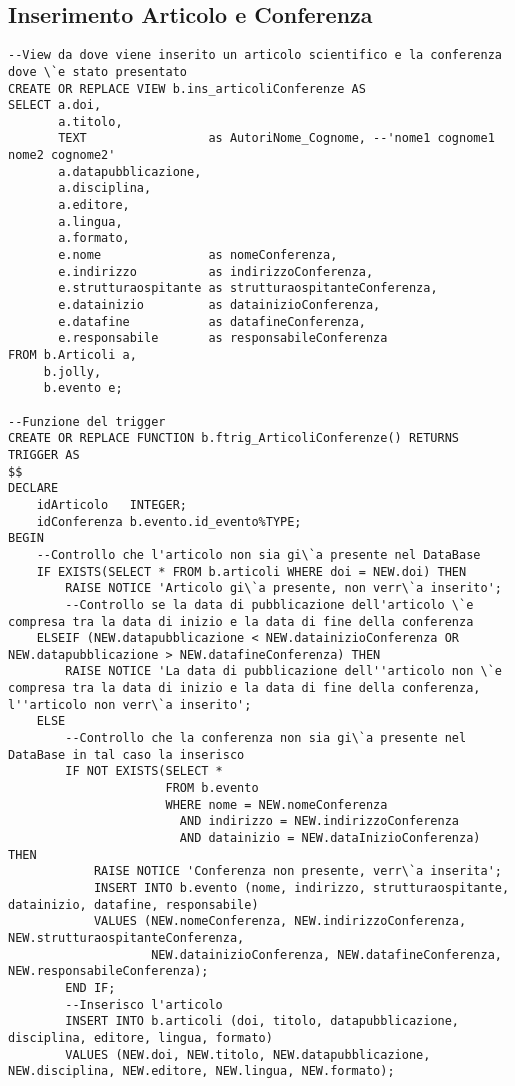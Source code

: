 \subsection{Inserimento Articolo e Conferenza}
\begin{lstlisting}
--View da dove viene inserito un articolo scientifico e la conferenza dove \`e stato presentato
CREATE OR REPLACE VIEW b.ins_articoliConferenze AS
SELECT a.doi,
       a.titolo,
       TEXT                 as AutoriNome_Cognome, --'nome1 cognome1 nome2 cognome2'
       a.datapubblicazione,
       a.disciplina,
       a.editore,
       a.lingua,
       a.formato,
       e.nome               as nomeConferenza,
       e.indirizzo          as indirizzoConferenza,
       e.strutturaospitante as strutturaospitanteConferenza,
       e.datainizio         as datainizioConferenza,
       e.datafine           as datafineConferenza,
       e.responsabile       as responsabileConferenza
FROM b.Articoli a,
     b.jolly,
     b.evento e;

--Funzione del trigger
CREATE OR REPLACE FUNCTION b.ftrig_ArticoliConferenze() RETURNS TRIGGER AS
$$
DECLARE
    idArticolo   INTEGER;
    idConferenza b.evento.id_evento%TYPE;
BEGIN
    --Controllo che l'articolo non sia gi\`a presente nel DataBase
    IF EXISTS(SELECT * FROM b.articoli WHERE doi = NEW.doi) THEN
        RAISE NOTICE 'Articolo gi\`a presente, non verr\`a inserito';
        --Controllo se la data di pubblicazione dell'articolo \`e compresa tra la data di inizio e la data di fine della conferenza
    ELSEIF (NEW.datapubblicazione < NEW.datainizioConferenza OR NEW.datapubblicazione > NEW.datafineConferenza) THEN
        RAISE NOTICE 'La data di pubblicazione dell''articolo non \`e compresa tra la data di inizio e la data di fine della conferenza, l''articolo non verr\`a inserito';
    ELSE
        --Controllo che la conferenza non sia gi\`a presente nel DataBase in tal caso la inserisco
        IF NOT EXISTS(SELECT *
                      FROM b.evento
                      WHERE nome = NEW.nomeConferenza
                        AND indirizzo = NEW.indirizzoConferenza
                        AND datainizio = NEW.dataInizioConferenza) THEN
            RAISE NOTICE 'Conferenza non presente, verr\`a inserita';
            INSERT INTO b.evento (nome, indirizzo, strutturaospitante, datainizio, datafine, responsabile)
            VALUES (NEW.nomeConferenza, NEW.indirizzoConferenza, NEW.strutturaospitanteConferenza,
                    NEW.datainizioConferenza, NEW.datafineConferenza, NEW.responsabileConferenza);
        END IF;
        --Inserisco l'articolo
        INSERT INTO b.articoli (doi, titolo, datapubblicazione, disciplina, editore, lingua, formato)
        VALUES (NEW.doi, NEW.titolo, NEW.datapubblicazione, NEW.disciplina, NEW.editore, NEW.lingua, NEW.formato);


\end{lstlisting}
